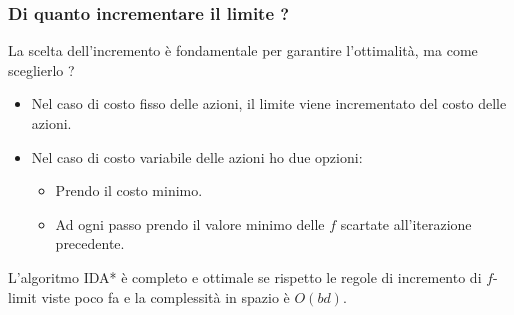 \subsubsection{Di quanto incrementare il limite ?}
La scelta dell'incremento \`e fondamentale per garantire l'ottimalit\`a, ma come
sceglierlo ?
\begin{itemize}
	\item Nel caso di costo fisso delle azioni, il limite viene incrementato del costo
	      delle azioni.
	\item Nel caso di costo variabile delle azioni ho due opzioni:
	      \begin{itemize}
		      \item Prendo il costo minimo.
		      \item Ad ogni passo prendo il valore minimo delle $f$ scartate
		            all'iterazione precedente.
	      \end{itemize}
\end{itemize}
L'algoritmo IDA* \`e completo e ottimale se rispetto le regole di incremento di $f$-limit
viste poco fa e la complessit\`a in spazio \`e $O(bd)$.